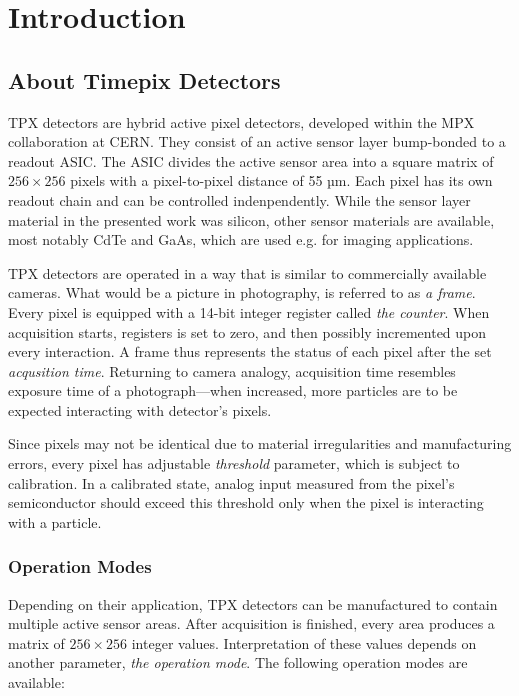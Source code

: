 \chapter{Introduction}

\section{About Timepix Detectors}
TPX detectors are hybrid active pixel detectors, developed within the MPX collaboration at CERN. They consist of an active sensor layer bump-bonded to a readout ASIC. The ASIC divides the active sensor area into a square matrix of $256 \times 256$ pixels with a pixel-to-pixel distance of 55 µm. Each pixel has its own readout chain and can be controlled indenpendently. While the sensor layer material in the presented work was silicon, other sensor materials are available, most notably CdTe and GaAs, which are used e.g. for imaging applications.

TPX detectors are operated in a way that is similar to commercially available cameras. What would be a picture in photography, is referred to as \textit{a frame}. Every pixel is equipped with a 14-bit integer register called \textit{the counter}. When acquisition starts, registers is set to zero, and then possibly incremented upon every interaction. A frame thus represents the status of each pixel after the set \textit{acqusition time}. Returning to camera analogy, acquisition time resembles exposure time of a photograph---when increased, more particles are to be expected interacting with detector's pixels.

Since pixels may not be identical due to material irregularities and manufacturing errors, every pixel has adjustable \textit{threshold} parameter, which is subject to calibration. In a calibrated state, analog input measured from the pixel's semiconductor should exceed this threshold only when the pixel is interacting with a particle.

\subsection{Operation Modes}
Depending on their application, TPX detectors can be manufactured to contain multiple active sensor areas. After acquisition is finished, every area produces a matrix of $256\times 256$ integer values. Interpretation of these values depends on another parameter, \textit{the operation mode}. The following operation modes are available:

